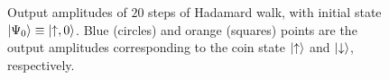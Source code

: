 \begin{figure}[tb]
    \centering
    \qquad
    \caption{
        Output amplitudes of $20$ steps of Hadamard walk, with initial state $\ket{\Psi_0}\equiv\ket{\uparrow,0}$.
        Blue (circles) and orange (squares) points are the output amplitudes corresponding to the coin state $\ket\uparrow$ and $\ket\downarrow$, respectively.
    }
    \label{fig:hadamardwalk_Nsteps}
\end{figure}




